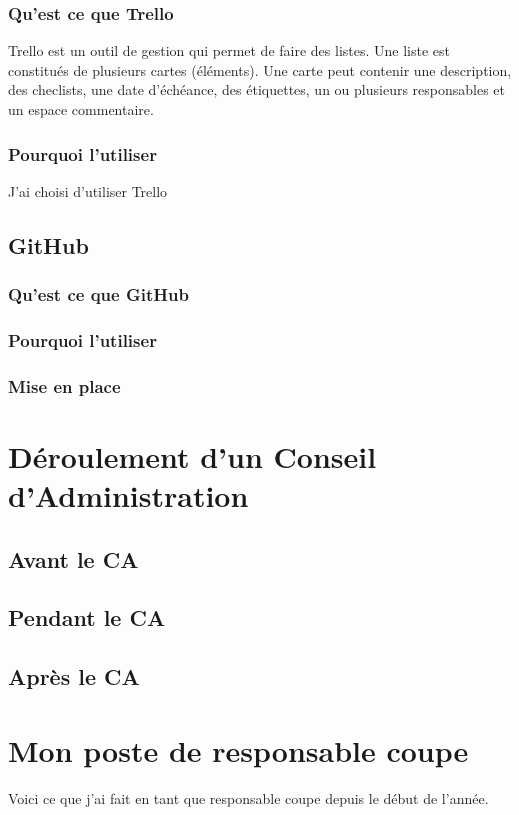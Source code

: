 \documentclass[12pt,a4paper]{report}
\begin{document}
      \subsubsection{Qu'est ce que Trello}
        Trello est un outil de gestion qui permet de faire des listes. Une liste est constitués de plusieurs cartes (éléments). Une carte peut contenir une description, des checlists, une date d'échéance, des étiquettes, un ou plusieurs responsables et un espace commentaire.

      \subsubsection{Pourquoi l'utiliser}
        J'ai choisi d'utiliser Trello

    \subsection{GitHub}
      \subsubsection{Qu'est ce que GitHub}
      \subsubsection{Pourquoi l'utiliser}
      \subsubsection{Mise en place}

  \section{Déroulement d'un Conseil d'Administration}
    \subsection{Avant le CA}
    \subsection{Pendant le CA}
    \subsection{Après le CA}

  \section{Mon poste de responsable coupe}
    Voici ce que j'ai fait en tant que responsable coupe depuis le début de l'année.
\end{document}
